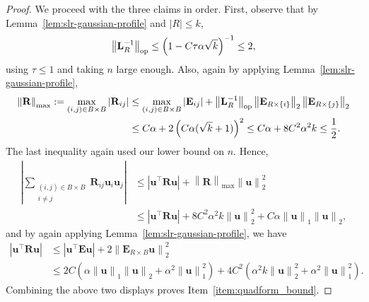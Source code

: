 \documentclass[11pt]{article}
\newcommand{\defeq}{:=}
\newcommand{\norm}[1]{\left\lVert#1\right\rVert}
\newcommand{\normop}[1]{\left\lVert#1\right\rVert_{\textup{op}}}
\newcommand{\half}{\frac{1}{2}}
\newcommand{\1}{\mathbf{1}}
\newcommand{\0}{\mathbf{0}}
\newcommand{\Par}[1]{\left(#1\right)}
\newcommand{\Abs}[1]{\left|#1\right|}
\newcommand{\me}{{\mathbf{E}}}
\newcommand{\ml}{{\mathbf{L}}}
\newcommand{\mr}{{\mathbf{R}}}
\newcommand{\vu}{{\mathbf{u}}}
\begin{document}
\begin{proof}
We proceed with the three claims in order. First, observe that by Lemma~\ref{lem:slr-gaussian-profile} and $|R| \le k$,
\begin{equation}\label{eq:inv_op_bound}\normop{\ml_R^{-1}} \le \Par{1 - C\tau\alpha\sqrt k}^{-1} \le 2,\end{equation}
using $\tau \le 1$ and taking $n$ large enough.
Also, again by applying Lemma~\ref{lem:slr-gaussian-profile},
\begin{equation}\label{eq:entrywise}
\begin{aligned}
\norm{\mr}_{\max} \defeq \max_{(i, j) \in B \times B} \Abs{\mr_{ij}} &\le \max_{(i, j) \in B \times B}\Abs{\me_{ij}} +  \normop{\ml_R^{-1}} \norm{\me_{R \times \{i\}}}_2 \norm{\me_{R \times \{j\}}}_2 \\
&\le C\alpha + 2\Par{C\alpha (\sqrt k + 1)}^2 \le C\alpha + 8C^2\alpha^2 k \le \half.
\end{aligned}
\end{equation}
The last inequality again used our lower bound on $n$. Hence,
\begin{align*}
\Abs{\sum_{\substack{(i, j) \in B \times B \\ i \neq j}} \mr_{ij}\vu_i\vu_j} &\le \Abs{\vu^\top \mr \vu} + \norm{\mr}_{\max}\norm{\vu}_2^2 \\
&\le \Abs{\vu^\top \mr \vu} + 8C^2 \alpha^2 k \norm{\vu}_2^2 + C\alpha\norm{\vu}_1\norm{\vu}_2,
\end{align*}
and by again applying Lemma~\ref{lem:slr-gaussian-profile}, we have
\begin{align*}
\Abs{\vu^\top \mr \vu} &\le \Abs{\vu^\top \me \vu} + 2\norm{\me_{R \times B}\vu}_2^2 \\
&\le 2C\Par{\alpha\norm{\vu}_1\norm{\vu}_2 + \alpha^2\norm{\vu}_1^2} + 4C^2\Par{\alpha^2k \norm{\vu}_2^2 +\alpha^2\norm{\vu}_1^2}.
\end{align*}
Combining the above two displays proves Item~\ref{item:quadform_bound}. 


\end{proof}
\end{document}
